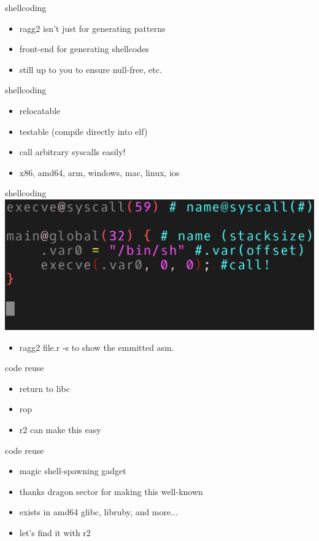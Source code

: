 \documentclass[10pt,pdf,utf8,english,compress,hyperref={unicode}]{beamer}
\begin{document}
\begin{frame}{shellcoding}
	\begin{itemize}
		\item ragg2 isn't just for generating patterns
		\item front-end for generating shellcodes
		\item still up to you to ensure null-free, etc.
	\end{itemize}
\end{frame}

\begin{frame}{shellcoding}
	\begin{itemize}
		\item relocatable
		\item testable (compile directly into elf)
		\item call arbitrary syscalls easily!
		\item x86, amd64, arm, windows, mac, linux, ios
	\end{itemize}
\end{frame}

\begin{frame}{shellcoding}
	\includegraphics[width=\textwidth]{crimages/shellcode.png}
	\begin{itemize}
		\item ragg2 file.r -s to show the emmitted asm.
	\end{itemize}
\end{frame}

\begin{frame}{code reuse}
	\begin{itemize}
		\item return to libc
		\item rop
		\item r2 can make this easy
	\end{itemize}
\end{frame}

\begin{frame}{code reuse}
	\begin{itemize}
		\item magic shell-spawning gadget
		\item thanks dragon sector for making this well-known
		\item exists in amd64 glibc, libruby, and more...
		\item let's find it with r2
	\end{itemize}
\end{frame}
\end{document}
